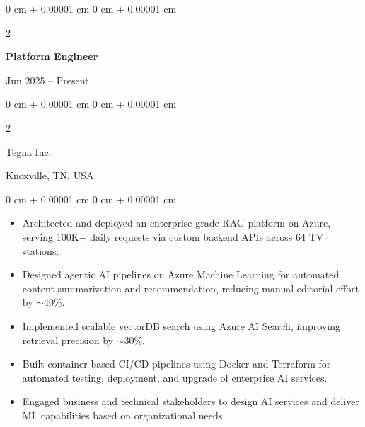 \documentclass[10pt, letterpaper]{article}
\newenvironment{highlights}{
    \begin{itemize}[
        topsep=0.10 cm,
        parsep=0.10 cm,
        partopsep=0pt,
        itemsep=0pt,
        leftmargin=0 cm + 10pt
    ]
}{
    \end{itemize}
} %
\newenvironment{onecolentry}{
    \begin{adjustwidth}{
        0 cm + 0.00001 cm
    }{
        0 cm + 0.00001 cm
    }
}{
    \end{adjustwidth}
} %
\newenvironment{twocolentry}[2][]{
    \onecolentry
    \def\secondColumn{#2}
    \setcolumnwidth{\fill, 4.5 cm}
    \begin{paracol}{2}
}{
    \switchcolumn \raggedleft \secondColumn
    \end{paracol}
    \endonecolentry
} %
\begin{document}
    \begin{twocolentry}{Jun 2025 -- Present}
        \textbf{Platform Engineer}
    \end{twocolentry}
    \begin{twocolentry}{Knoxville, TN, USA}
       Tegna Inc.
    \end{twocolentry}
    
    \begin{onecolentry}
        \begin{highlights}
            \item Architected and deployed an enterprise-grade RAG platform on Azure, serving 100K+ daily requests via custom backend APIs across 64 TV stations.
            \item Designed agentic AI pipelines on Azure Machine Learning for automated content summarization and recommendation, reducing manual editorial effort by $\sim$40\%.
            \item Implemented scalable vectorDB search using Azure AI Search, improving retrieval precision by $\sim$30\%.
            \item Built container-based CI/CD pipelines using Docker and Terraform for automated testing, deployment, and upgrade of enterprise AI services.
            \item Engaged business and technical stakeholders to design AI services and deliver ML capabilities based on organizational needs.
        \end{highlights}
    \end{onecolentry}

\vspace{1mm}
    
\end{document}
